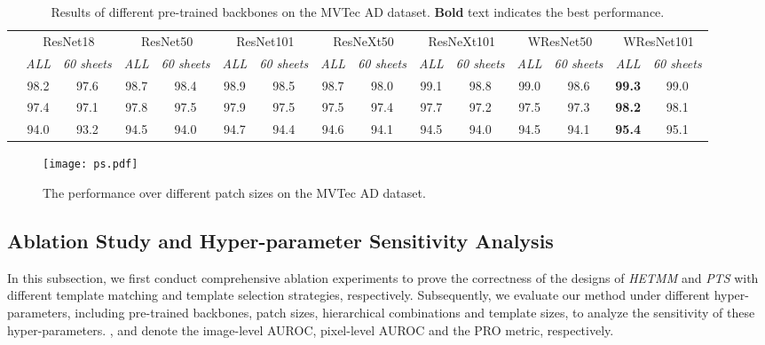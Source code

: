 \documentclass[default,iicol]{sn-jnl}\usepackage[algo2e,ruled,linesnumbered]{algorithm2e}
\theoremstyle{thmstyleone}\newtheorem{theorem}{Theorem}\newtheorem{proposition}[theorem]{Proposition}
\theoremstyle{thmstyletwo}\newtheorem{example}{Example}\newtheorem{remark}{Remark}
\theoremstyle{thmstylethree}\newtheorem{definition}{Definition}
\begin{document}
\begin{table*}[!t]
\caption{
        Results of different pre-trained backbones on the MVTec AD dataset.
        \textbf{Bold} text indicates the best performance.
    }
    \centering
    \tiny
    \label{table:backbones}
    \begin{tabular}{c|cc|cc|cc|cc|cc|cc|cc}
    \hline
    \multirow{2}{*}{}&\multicolumn{2}{c|}{ResNet18} &\multicolumn{2}{c|}{ResNet50} &\multicolumn{2}{c|}{ResNet101} &\multicolumn{2}{c|}{ResNeXt50} &\multicolumn{2}{c|}{ResNeXt101} &\multicolumn{2}{c|}{WResNet50} &\multicolumn{2}{c}{WResNet101}\\\hhline{~--------------}
    & \textit{ALL} & \textit{60 sheets} & \textit{ALL} & \textit{60 sheets} & \textit{ALL} & \textit{60 sheets} & \textit{ALL} & \textit{60 sheets} & \textit{ALL} & \textit{60 sheets} & \textit{ALL} & \textit{60 sheets} & \textit{ALL} & \textit{60 sheets}\\\hline
     &98.2&97.6&98.7&98.4&98.9&98.5&98.7&98.0&99.1&98.8&99.0&98.6&\textbf{99.3}&99.0\\
     &97.4&97.1&97.8&97.5&97.9&97.5&97.5&97.4&97.7&97.2&97.5&97.3&\textbf{98.2}&98.1\\
         &94.0&93.2&94.5&94.0&94.7&94.4&94.6&94.1&94.5&94.0&94.5&94.1&\textbf{95.4}&95.1\\\hline
    \end{tabular}
\end{table*}


\begin{figure*}[!t]
    \centering
    \texttt{[image: ps.pdf]}
    \caption{
    The performance over different patch sizes on the MVTec AD dataset.
    }
    \label{fig:ps}
\end{figure*}



\subsection{Ablation Study and Hyper-parameter Sensitivity Analysis}
In this subsection, we first conduct comprehensive ablation experiments to prove the correctness of the designs of \textit{HETMM} and \textit{PTS} with different template matching and template selection strategies, respectively.
Subsequently, we evaluate our method under different hyper-parameters, including pre-trained backbones, patch sizes, hierarchical combinations and template sizes, to analyze the sensitivity of these hyper-parameters.
,  and  denote the image-level AUROC, pixel-level AUROC and the PRO metric, respectively.
\end{document}
